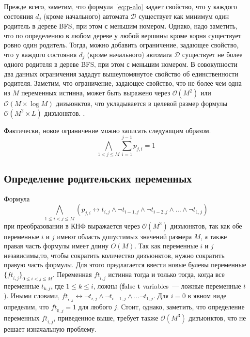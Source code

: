 Прежде всего, заметим, что формула~\eqref{eq:p-alo} задает свойство, что у каждого состояния $d_{j}$ (кроме начального) автомата $\mathcal{D}$ существует как минимум один родитель в дереве BFS, при этом с меньшим номером.
Однако, надо заметить, что по определению в любом дереве у любой вершины кроме корня существует ровно один родитель.
Тогда, можно добавить ограничение, задающее свойство, что у каждого состояния $d_{j}$ (кроме начального) автомата $\mathcal{D}$ существует не более одного родителя в дереве BFS, при этом с меньшим номером.
В совокупности два данных ограничения зададут вышеупомянутое свойство об единственности родителя.
Заметим, что ограничение, задающее свойство, что не более чем одна из $M$ переменных истинна, может быть выражено через $\mathcal{O}\left(M^2\right)$ или $\mathcal{O}\left(M\times \log M\right)$ дизъюнктов, что укладывается в целевой размер формулы $\mathcal{O}\left(M^{2} \times L\right)$ дизъюнктов.
.

Фактически, новое ограничение можно записать следующим образом.
\begin{equation}
\label{eq:p-sum-eq-one}
  \bigwedge_{1 < j \leq M} \sum_{i=1}^{j-1}p_{j,i}=1
\end{equation}


\subsection{Определение родительских переменных}
\label{sec:space:tight:p-def}

Формула $$\bigwedge_{1 \leq i < j \leq M} \left(p_{j,i} \leftrightarrow t_{i,j} \wedge \neg t_{i - 1,j} \wedge \neg t_{i - 2, j} \wedge \ldots \wedge \neg t_{1,j}\right)$$ при преобразовании в КНФ выражается через $\mathcal{O}\left(M^{3}\right)$ дизъюнктов, так как обе переменные $i$ и $j$ имеют область допустимых значений размера $M$, а также правая часть формулы имеет длину $O\left(M\right)$.
Так как переменные $i$ и $j$ независимы,то, чтобы сократить количество дизъюнктов, нужно сократить правую часть формулы.
Для этого предлагается ввести новые булевы переменные $\{\mathit{ft}_{i,j}\}_{0 \leq i < j \leq M}$.
Переменная $\mathit{ft}_{i,j}$ истинна тогда и только тогда, когда все переменные $t_{k,j}$, где $1 \leq k \leq i$, ложны (\textbf{f}alse $\boldsymbol{t}$ variables~{---} ложные переменные $t$).
Иными словами, $\mathit{ft}_{i,j} \leftrightarrow \neg t_{i,j} \wedge \neg t_{i - 1, j} \wedge \ldots \neg t_{1,j}$. 
Для $i = 0$ в явном виде определим, что $\mathit{ft}_{0,j} = 1$ для любого $j$.
Стоит, однако, заметить, что определение переменных $\mathit{ft}_{i,j}$, приведенное выше, требует также $\mathcal{O}\left(M^3\right)$ дизъюнктов, что не решает изначальную проблему.

